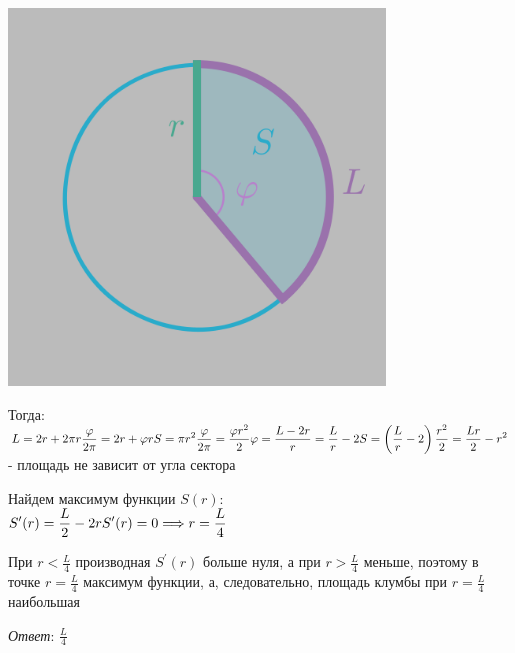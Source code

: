 \begin{enumerate}
    \begin{center}
        \includegraphics[width=10cm]{images/3b1}
    \end{center}

    Тогда: \\
    $\displaystyle
    L = 2r + 2\pi r \frac{\varphi}{2\pi} = 2r + \varphi r\\
    S = \pi r^2 \frac{\varphi}{2\pi} = \frac{\varphi r^2}{2}\\
    \varphi = \frac{L - 2r}{r} = \frac{L}{r} - 2\\
    S = \left(\frac{L}{r} - 2\right)\frac{r^2}{2} = \frac{Lr}{2} - r^2$ - площадь не зависит от угла сектора

    Найдем максимум функции $S(r)$:\\
    $\displaystyle S^\prime(r) = \frac{L}{2} - 2r\\
    S^\prime(r) = 0 \Longrightarrow r = \frac{L}{4}$

    При $\displaystyle r < \frac{L}{4}$ производная $S^\prime(r)$ больше нуля, а при $\displaystyle r > \frac{L}{4}$ меньше,
    поэтому в точке $\displaystyle r = \frac{L}{4}$ максимум функции, а, следовательно, площадь клумбы при $\displaystyle r = \frac{L}{4}$ наибольшая

    \vspace{5mm}
    \textit{Ответ}: $\displaystyle \frac{L}{4}$
\end{enumerate}


\clearpage
